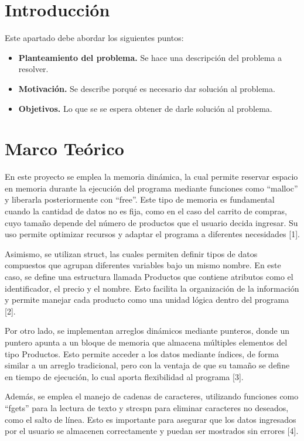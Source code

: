 \documentclass[letterpaper,12pt,oneside]{article}
\begin{document}
\tableofcontents
\clearpage

\section{Introducción}

Este apartado debe abordar los siguientes puntos:

\begin{itemize}
\item \textbf{Planteamiento del problema.} Se hace una descripción del problema a resolver.
\item \textbf{Motivación.} Se describe porqué es necesario dar solución al problema.
\item \textbf{Objetivos.} Lo que se se espera obtener de darle solución al problema.
\end{itemize}

\section{Marco Teórico}

En este proyecto se emplea la memoria dinámica, la cual permite reservar espacio en memoria durante la ejecución del programa mediante funciones como “malloc” y liberarla posteriormente con “free”. Este tipo de memoria es fundamental cuando la cantidad de datos no es fija, como en el caso del carrito de compras, cuyo tamaño depende del número de productos que el usuario decida ingresar. Su uso permite optimizar recursos y adaptar el programa a diferentes necesidades [1].

Asimismo, se utilizan struct, las cuales permiten definir tipos de datos compuestos que agrupan diferentes variables bajo un mismo nombre. En este caso, se define una estructura llamada Productos que contiene atributos como el identificador, el precio y el nombre. Esto facilita la organización de la información y permite manejar cada producto como una unidad lógica dentro del programa [2].

Por otro lado, se implementan arreglos dinámicos mediante punteros, donde un puntero apunta a un bloque de memoria que almacena múltiples elementos del tipo Productos. Esto permite acceder a los datos mediante índices, de forma similar a un arreglo tradicional, pero con la ventaja de que su tamaño se define en tiempo de ejecución, lo cual aporta flexibilidad al programa [3].

Además, se emplea el manejo de cadenas de caracteres, utilizando funciones como “fgets” para la lectura de texto y strcspn para eliminar caracteres no deseados, como el salto de línea. Esto es importante para asegurar que los datos ingresados por el usuario se almacenen correctamente y puedan ser mostrados sin errores [4].
\end{document}
